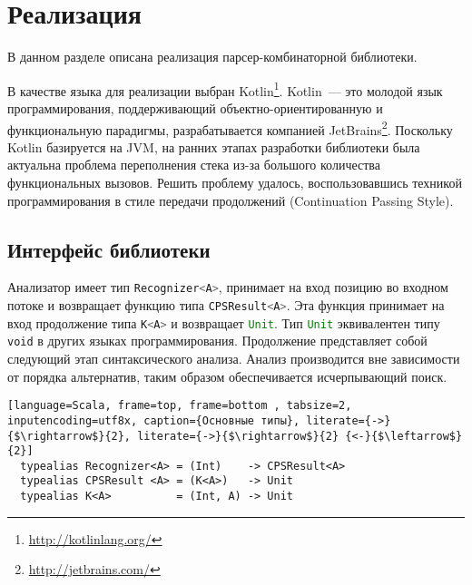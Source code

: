 \section{Реализация}

В данном разделе описана реализация парсер-комбинаторной библиотеки.

В качестве языка для реализации выбран Kotlin\footnote{\url{http://kotlinlang.org/}}. Kotlin~--- это молодой язык программирования, поддерживающий объектно-ориентированную и функциональную парадигмы, разрабатывается компанией JetBrains\footnote{\url{http://jetbrains.com/}}. Поскольку Kotlin базируется на JVM, на ранних этапах разработки библиотеки была актуальна проблема переполнения стека из-за большого количества функциональных вызовов. Решить проблему удалось, воспользовавшись техникой программирования в стиле передачи продолжений (Continuation Passing Style).
  
    \subsection{Интерфейс библиотеки}
  
Анализатор имеет тип \lstinline[language=Scala]{Recognizer<A>}, принимает на вход позицию во входном потоке и возвращает функцию типа \lstinline[language=Scala]{CPSResult<A>}. Эта функция принимает на вход продолжение типа \lstinline[language=Scala]{K<A>} и возвращает \lstinline[language=Scala]{Unit}. Тип \lstinline[language=Scala]{Unit} эквивалентен типу {\tt void} в других языках программирования. Продолжение представляет собой следующий этап синтаксического анализа. Анализ производится вне зависимости от порядка
    альтернатив, таким образом обеспечивается исчерпывающий поиск. 
    
  \begin{lstlisting}[language=Scala, frame=top, frame=bottom , tabsize=2, inputencoding=utf8x, caption={Основные типы}, literate={->}{$\rightarrow$}{2}, literate={->}{$\rightarrow$}{2} {<-}{$\leftarrow$}{2}]
  typealias Recognizer<A> = (Int)    -> CPSResult<A> 
  typealias CPSResult <A> = (K<A>)   -> Unit
  typealias K<A>          = (Int, A) -> Unit
  \end{lstlisting}
  
